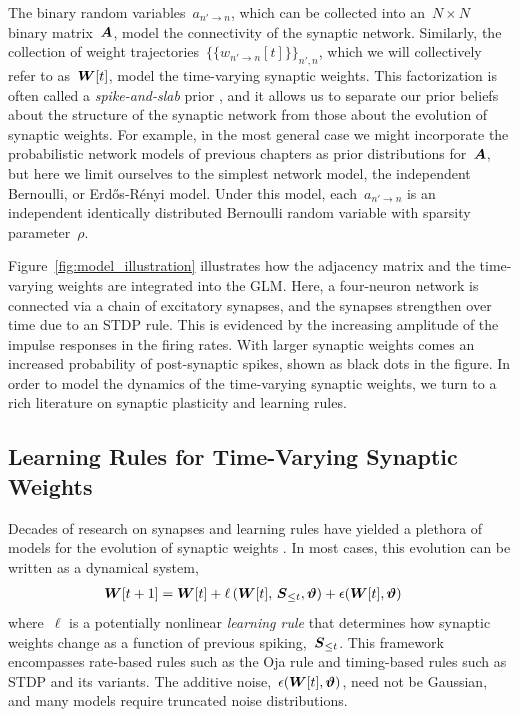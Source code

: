 The binary random variables~$a_{n' \to n}$, which can be collected
into an~${N\times N}$ binary matrix~$\boldsymbol{A}$, model the connectivity of
the synaptic network. Similarly, the collection of weight
trajectories~${\{\{w_{n' \to n}[t]\}\}_{n',n}}$, which we will
collectively refer to as~$\boldsymbol{W}[t]$, model the time-varying synaptic
weights. This factorization is often called a \emph{spike-and-slab}
prior \citep{Mitchell1988}, and it allows us to separate our prior
beliefs about the structure of the synaptic network from those about
the evolution of synaptic weights. For example, in the most general
case we might incorporate the probabilistic network models of previous
chapters as prior distributions for~$\boldsymbol{A}$, but here we limit ourselves
to the simplest network model, the independent Bernoulli, or
Erd\H{o}s-R\'enyi model. Under this model, each~$a_{n' \to n}$ is an
independent identically distributed Bernoulli random variable with
sparsity parameter~$\rho$.

Figure~\ref{fig:model_illustration} illustrates how the adjacency
matrix and the time-varying weights are integrated into the GLM. Here,
a four-neuron network is connected via a chain of excitatory synapses,
and the synapses strengthen over time due to an STDP rule. This is
evidenced by the increasing amplitude of the impulse responses in the
firing rates.  With larger synaptic weights comes an increased
probability of post-synaptic spikes, shown as black dots in the
figure. In order to model the dynamics of the time-varying synaptic
weights, we turn to a rich literature on synaptic plasticity and
learning rules.

\subsection{Learning Rules for Time-Varying Synaptic Weights}
Decades of research on synapses and learning rules have yielded a
plethora of models for the evolution of synaptic weights
\citep{Caporale-2008}. In most cases, this evolution can be written as
a dynamical system,
\begin{align*} 
\boldsymbol{W}[t+1] &= \boldsymbol{W}[t] + \ell\left(\boldsymbol{W}[t], \, \boldsymbol{S}_{\leq t}, \boldsymbol{\vartheta} \right) + \epsilon(\boldsymbol{W}[t], \boldsymbol{\vartheta})
\end{align*}
where~$\ell$ is a potentially nonlinear \emph{learning rule} that
determines how synaptic weights change as a function of previous
spiking,~$\boldsymbol{S}_{\leq t}$. This framework encompasses rate-based rules such as the Oja
rule \citep{Oja-1982} and timing-based rules such as STDP and its
variants. The additive noise,~${\epsilon(\boldsymbol{W}[t], \boldsymbol{\vartheta})}$, need not be
Gaussian, and many models require truncated noise distributions.

